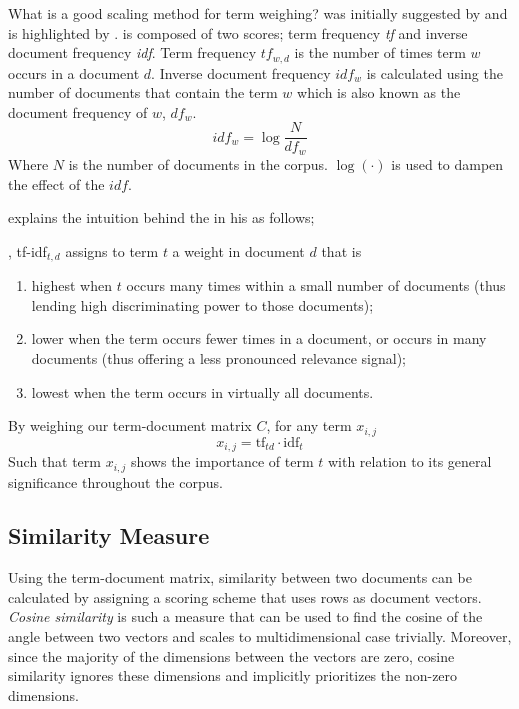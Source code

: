 What is a good scaling method for term weighing?
\tfidf{} was initially suggested by \textcite{jones_statistical_1972} and is highlighted by \textcite{manning_introduction_2009}.
\tfidf{} is composed of two scores; term frequency \emph{tf} and inverse document frequency \emph{idf}.
Term frequency $tf_{w,d}$ is the number of times term $w$ occurs in a document $d$.
Inverse document frequency $idf_{w}$ is calculated using the number of documents that contain the term $w$ which is also known as the document frequency of $w$, $df_w$.
\begin{equation}
    idf_w = \log{\frac{N}{df_w}}
\end{equation}
Where $N$ is the number of documents in the corpus. $\log(\cdot)$ is used to dampen the effect of the $idf$.

\citeauthor{manning_introduction_2009} explains the intuition behind the \tfidf{} in his  as follows;
\begin{displayquote}
    \textelp{}, tf-idf$_{t,d}$ assigns to term $t$ a weight in document $d$ that is
    \begin{enumerate}
        \item highest when $t$ occurs many times within a small number of documents (thus lending high discriminating power to those documents);
        \item lower when the term occurs fewer times in a document, or occurs in many documents (thus offering a less pronounced relevance signal);
        \item lowest when the term occurs in virtually all documents.
    \end{enumerate}
\end{displayquote}
By weighing our term-document matrix $C$, for any term $x_{i,j}$
\begin{equation}
x_{i,j} = \text{tf}_{td} \cdot \text{idf}_{t} \end{equation}
Such that term $x_{i,j}$ shows the importance of term $t$ with relation to its general significance throughout the corpus.

\subsection{Similarity Measure}%
\label{sub:similarity_measure}

Using the term-document matrix, similarity between two documents can be calculated by assigning a scoring scheme that uses rows as document vectors.
\emph{Cosine similarity} is such a measure that can be used to find the cosine of the angle between two vectors and scales to multidimensional case trivially.
Moreover, since the majority of the dimensions between the vectors are zero, cosine similarity ignores these dimensions and implicitly prioritizes the non-zero dimensions.

